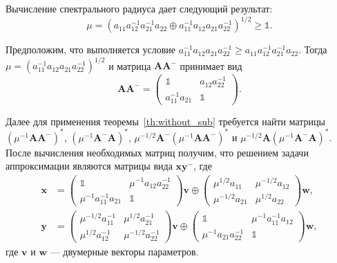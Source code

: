 \documentclass[specialist,
               substylefile = spbu.rtx,
               subf,href,colorlinks=true, 12pt]{disser}
\theoremstyle{definition}
\begin{document}
Вычисление спектрального радиуса дает следующий результат:
\begin{equation*}
\mu
=
(a_{11}a_{12}^{-1}a_{21}^{-1}a_{22}
\oplus
a_{11}^{-1}a_{12}a_{21}a_{22}^{-1})^{1/2}
\geq
\mathbb{1}.
\end{equation*}

Предположим, что выполняется условие $a_{11}^{-1}a_{12}a_{21}a_{22}^{-1}\geq a_{11}a_{12}^{-1}a_{21}^{-1}a_{22}$. Тогда $\mu=(a_{11}^{-1}a_{12}a_{21}a_{22}^{-1})^{1/2}$ и матрица $\bm{A}\bm{A}^{-}$ принимает вид
\begin{equation*}
\bm{A}\bm{A}^{-}
=
\begin{pmatrix}
\mathbb{1} &a_{12}a_{22}^{-1}
\\
a_{11}^{-1}a_{21} &\mathbb{1}
\end{pmatrix}.
\end{equation*}

Далее для применения теоремы~\ref{th:without_sub} требуется найти матрицы 
$(\mu^{-1}\bm{A}\bm{A}^{-})^{\ast}$, 
$(\mu^{-1}\bm{A}^{-}\bm{A})^{\ast}$,
$\mu^{-1/2}\bm{A}^{-}(\mu^{-1}\bm{A}\bm{A}^{-})^{\ast}$ и 
$\mu^{-1/2}\bm{A}(\mu^{-1}\bm{A}^{-}\bm{A})^{\ast}$.
После вычисления необходимых матриц получим, что решением задачи аппроксимации являются матрицы вида $\bm{x}\bm{y}^{-}$, где %
\begin{align*}
\bm{x}
&=
\begin{pmatrix}
\mathbb{1} &\mu^{-1}a_{12}a_{22}^{-1}
\\
\mu^{-1}a_{11}^{-1}a_{21} &\mathbb{1}
\end{pmatrix}
\bm{v}
\oplus
\begin{pmatrix}
\mu^{1/2} a_{11} &\mu^{-1/2}a_{12}
\\
\mu^{-1/2}a_{21} &\mu^{1/2} a_{22}
\end{pmatrix}
\bm{w},
\\
\bm{y}
&=
\begin{pmatrix}
\mu^{-1/2}a_{11}^{-1} &\mu^{1/2} a_{21}^{-1}
\\
\mu^{1/2} a_{12}^{-1} &\mu^{-1/2}a_{22}^{-1}
\end{pmatrix}
\bm{v}
\oplus
\begin{pmatrix}
\mathbb{1} &\mu^{-1}a_{11}^{-1}a_{12}\\
\mu^{-1}a_{21}a_{22}^{-1} &\mathbb{1}
\end{pmatrix}
\bm{w},
\end{align*}
где $\bm{v}$ и $\bm{w}$ --- двумерные векторы параметров.
\end{document}
